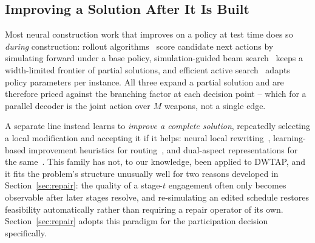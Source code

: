 \subsection{Improving a Solution After It Is Built}

Most neural construction work that improves on a policy at test time does so \emph{during} construction: rollout algorithms~\cite{bertsekas1997rollout} score candidate next actions by simulating forward under a base policy, simulation-guided beam search~\cite{choo2022sgbs} keeps a width-limited frontier of partial solutions, and efficient active search~\cite{hottung2022eas} adapts policy parameters per instance. All three expand a partial solution and are therefore priced against the branching factor at each decision point -- which for a parallel decoder is the joint action over $M$ weapons, not a single edge.

A separate line instead learns to \emph{improve a complete solution}, repeatedly selecting a local modification and accepting it if it helps: neural local rewriting~\cite{chen2019rewriter}, learning-based improvement heuristics for routing~\cite{wu2021improvement}, and dual-aspect representations for the same~\cite{ma2021dact}.
This family has not, to our knowledge, been applied to DWTAP, and it fits the problem's structure unusually well for two reasons developed in Section~\ref{sec:repair}: the quality of a stage-$t$ engagement often only becomes observable after later stages resolve, and re-simulating an edited schedule restores feasibility automatically rather than requiring a repair operator of its own. Section~\ref{sec:repair} adopts this paradigm for the participation decision specifically.

